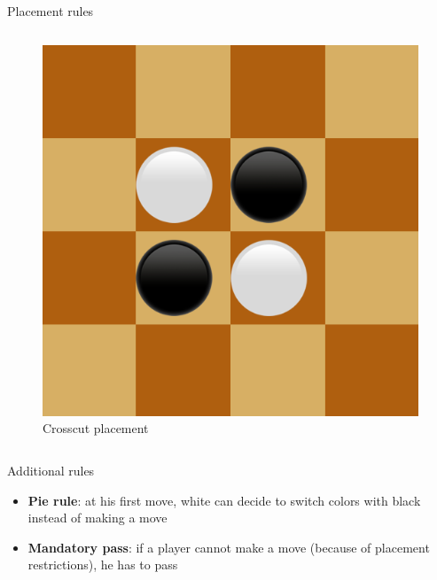 \documentclass{beamer}
\begin{document}
\begin{frame}{Placement rules}
\begin{columns}
			\begin{figure}
				\includegraphics[scale=0.35]{images/crosscut.png}
				\caption*{Crosscut placement}
			\end{figure}
		
	\end{columns}
      \end{frame}
      
      \begin{frame}{Additional rules}
     \begin{itemize}
     \item \textbf{Pie rule}: at his first move, white can decide to switch colors with black instead of making a move
     \item \textbf{Mandatory pass}: if a player cannot make a move (because of placement restrictions), he has to pass
     \end{itemize}
      \end{frame}
     
\end{document}
